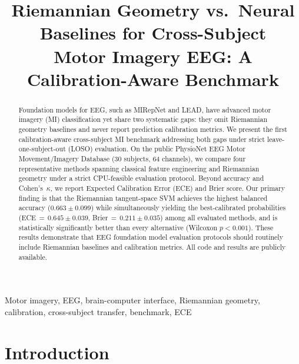 \documentclass[conference]{IEEEtran}
\begin{document}
\title{Riemannian Geometry vs.\ Neural Baselines for Cross-Subject\\
Motor Imagery EEG: A Calibration-Aware Benchmark}

\author{
}

\maketitle

\begin{abstract}
Foundation models for EEG, such as MIRepNet and LEAD, have advanced motor
imagery (MI) classification yet share two systematic gaps: they omit
Riemannian geometry baselines and never report prediction calibration
metrics. We present the first calibration-aware cross-subject MI benchmark
addressing both gaps under strict leave-one-subject-out (LOSO) evaluation.
On the public PhysioNet EEG Motor Movement/Imagery Database (30 subjects,
64 channels), we compare four representative methods spanning classical
feature engineering and Riemannian geometry under a strict CPU-feasible
evaluation protocol. Beyond accuracy and Cohen's~$\kappa$, we report
Expected Calibration Error (ECE) and Brier score. Our primary finding is
that the Riemannian tangent-space SVM achieves the highest balanced
accuracy ($0.663 \pm 0.099$) while simultaneously yielding the
best-calibrated probabilities (ECE\,$=\,0.645 \pm 0.039$,
Brier\,$=\,0.211 \pm 0.035$) among all evaluated methods, and is
statistically significantly better than every alternative
(Wilcoxon $p < 0.001$). These results demonstrate that EEG foundation
model evaluation protocols should routinely include Riemannian baselines
and calibration metrics. All code and results are publicly available.
\end{abstract}

\begin{IEEEkeywords}
Motor imagery, EEG, brain-computer interface, Riemannian geometry,
calibration, cross-subject transfer, benchmark, ECE
\end{IEEEkeywords}

\section{Introduction}
\label{sec:intro}
\end{document}
